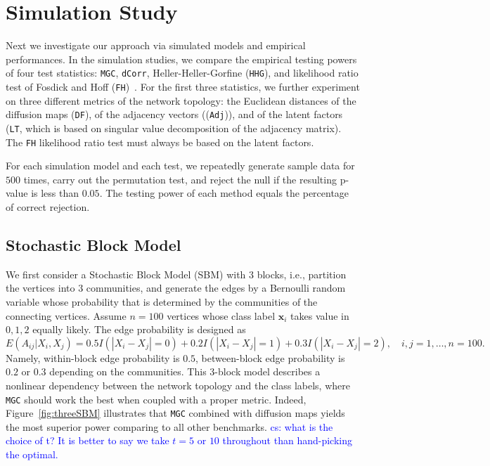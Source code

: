 \documentclass[11pt]{article}
\theoremstyle{definition}
\newcommand{\cs}[1]{\textcolor{blue}{cs: #1}}
\begin{document}
\section{Simulation Study}
\label{sec:simulation}
	\vspace*{-0.2cm}
Next we investigate our approach via simulated models and empirical performances. In the simulation studies, we compare the empirical testing powers of four test statistics: \texttt{MGC}, \texttt{dCorr}, Heller-Heller-Gorfine (\texttt{HHG}), and likelihood ratio test of Fosdick and Hoff (\texttt{FH})~\cite{fosdick2015testing}. For the first three statistics, we further experiment on three different metrics of the network topology: the Euclidean distances of the diffusion maps (\texttt{DF}), of the adjacency vectors ((\texttt{Adj})), and of the latent factors (\texttt{LT}, which is based on singular value decomposition of the adjacency matrix). The \texttt{FH} likelihood ratio test must always be based on the latent factors.

For each simulation model and each test, we repeatedly generate sample data for $500$ times, carry out the permutation test, and reject the null if the resulting p-value is less than $0.05$. The testing power of each method equals the percentage of correct rejection. %

\subsection{Stochastic Block Model}

We first consider a Stochastic Block Model (SBM) with $3$ blocks, i.e., partition the vertices into $3$ communities, and generate the edges by a Bernoulli random variable whose probability that is determined by the communities of the connecting vertices. Assume $n=100$ vertices whose class label $\mathbf{x}_i$ takes value in $0,1,2$ equally likely. The edge probability is designed as
\begin{equation}
\label{eq:Three}
E(A_{ij} | X_{i}, X_{j}) = 0.5 I(|X_{i} - X_{j}| = 0) + 0.2 I(|X_{i} - X_{j}| = 1) + 0.3 I(|X_{i} - X_{j}| = 2), \quad i,j = 1, \ldots, n = 100.
\end{equation} 
Namely, within-block edge probability is $0.5$, between-block edge probability is $0.2$ or $0.3$ depending on the communities. This 3-block model describes a nonlinear dependency between the network topology and the class labels, where \texttt{MGC} should work the best when coupled with a proper metric. Indeed, Figure~\ref{fig:threeSBM} illustrates that \texttt{MGC} combined with diffusion maps yields the most superior power comparing to all other benchmarks.
\cs{what is the choice of t? It is better to say we take $t=5$ or $10$ throughout than hand-picking the optimal.}
\end{document}
